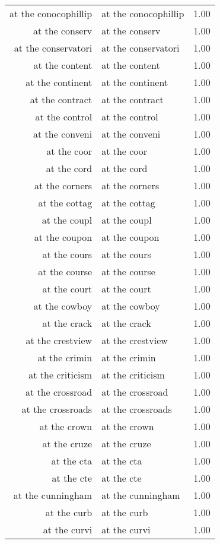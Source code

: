 \begin{table}[ht]
\begin{tabular}{rlr}
  at the conocophillip & at the conocophillip & 1.00 \\ 
  at the conserv & at the conserv & 1.00 \\ 
  at the conservatori & at the conservatori & 1.00 \\ 
  at the content & at the content & 1.00 \\ 
  at the continent & at the continent & 1.00 \\ 
  at the contract & at the contract & 1.00 \\ 
  at the control & at the control & 1.00 \\ 
  at the conveni & at the conveni & 1.00 \\ 
  at the coor & at the coor & 1.00 \\ 
  at the cord & at the cord & 1.00 \\ 
  at the corners & at the corners & 1.00 \\ 
  at the cottag & at the cottag & 1.00 \\ 
  at the coupl & at the coupl & 1.00 \\ 
  at the coupon & at the coupon & 1.00 \\ 
  at the cours & at the cours & 1.00 \\ 
  at the course & at the course & 1.00 \\ 
  at the court & at the court & 1.00 \\ 
  at the cowboy & at the cowboy & 1.00 \\ 
  at the crack & at the crack & 1.00 \\ 
  at the crestview & at the crestview & 1.00 \\ 
  at the crimin & at the crimin & 1.00 \\ 
  at the criticism & at the criticism & 1.00 \\ 
  at the crossroad & at the crossroad & 1.00 \\ 
  at the crossroads & at the crossroads & 1.00 \\ 
  at the crown & at the crown & 1.00 \\ 
  at the cruze & at the cruze & 1.00 \\ 
  at the cta & at the cta & 1.00 \\ 
  at the cte & at the cte & 1.00 \\ 
  at the cunningham & at the cunningham & 1.00 \\ 
  at the curb & at the curb & 1.00 \\ 
  at the curvi & at the curvi & 1.00 \\ 

\end{tabular}
\end{table}

